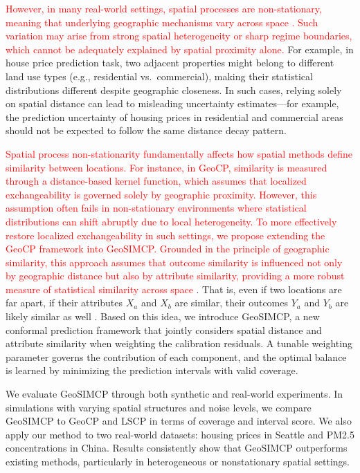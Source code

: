 \documentclass[authoryear,preprint,review,12pt]{elsarticle}
\begin{document}
\textcolor{red}{However, in many real-world settings, spatial processes are non-stationary, meaning that underlying geographic mechanisms vary across space \citep{wang2024probing}. Such variation may arise from strong spatial heterogeneity or sharp regime boundaries, which cannot be adequately explained by spatial proximity alone.} For example, in house price prediction task, two adjacent properties might belong to different land use types (e.g., residential vs.\ commercial), making their statistical distributions different despite geographic closeness. In such cases, relying solely on spatial distance can lead to misleading uncertainty estimates—for example, the prediction uncertainty of housing prices in residential and commercial areas should not be expected to follow the same distance decay pattern. 

\textcolor{red}{Spatial process non-stationarity fundamentally affects how spatial methods define similarity between locations. For instance, in GeoCP, similarity is measured through a distance-based kernel function, which assumes that localized exchangeability is governed solely by geographic proximity. However, this assumption often fails in non-stationary environments where statistical distributions can shift abruptly due to local heterogeneity. To more effectively restore localized exchangeability in such settings, we propose extending the GeoCP framework into GeoSIMCP. Grounded in the principle of geographic similarity, this approach assumes that outcome similarity is influenced not only by geographic distance but also by attribute similarity, providing a more robust measure of statistical similarity across space \citep{zhu2018spatial}}. That is, even if two locations are far apart, if their attributes $X_a$ and $X_b$ are similar, their outcomes $Y_a$ and $Y_b$ are likely similar as well \citep{zhu2022third}. Based on this idea, we introduce GeoSIMCP, a new conformal prediction framework that jointly considers spatial distance and attribute similarity when weighting the calibration residuals. A tunable weighting parameter governs the contribution of each component, and the optimal balance is learned by minimizing the prediction intervals with valid coverage. 

We evaluate GeoSIMCP through both synthetic and real-world experiments. In simulations with varying spatial structures and noise levels, we compare GeoSIMCP to GeoCP and LSCP in terms of coverage and interval score. We also apply our method to two real-world datasets: housing prices in Seattle and PM2.5 concentrations in China. Results consistently show that GeoSIMCP outperforms existing methods, particularly in heterogeneous or nonstationary spatial settings.
\end{document}

